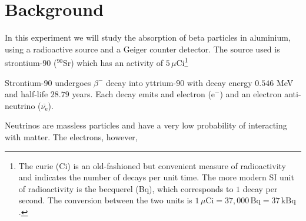 \section{Background}%

In this experiment we will study the absorption of beta particles in aluminium, using a radioactive source and a Geiger counter detector. The source used is strontium-$90$ ($^{90}$Sr) which has an activity of $5\,\mu$Ci\footnote{The curie (Ci) is an old-fashioned but convenient measure of radioactivity and indicates the number of decays per unit time. The more modern SI unit of radioactivity is the becquerel (Bq), which corresponds to $1$ decay per second. The conversion between the two units is $1\,\mu\textrm{Ci} = 37,000\,\textrm{Bq} = 37\,\textrm{kBq}$.}

Strontium-$90$ undergoes $\beta^{-}$ decay into yttrium-$90$ with decay energy $0.546$ MeV and half-life $28.79$ years. Each decay emits and electron ($\mathrm{e}^-$) and an electron anti-neutrino ($\overbar{\nu_\mathrm{e}}$).

Neutrinos are massless particles and have a very low probability of interacting with matter. The electrons, however, 

